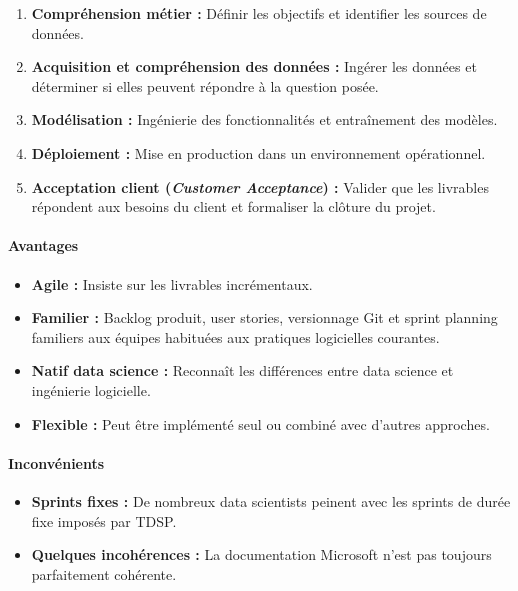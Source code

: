 \begin{enumerate}[leftmargin=*, label=\arabic*.]
  \item \textbf{Compréhension métier :} Définir les objectifs et identifier les sources
        de données.
  \item \textbf{Acquisition et compréhension des données :} Ingérer les données et
        déterminer si elles peuvent répondre à la question posée.
  \item \textbf{Modélisation :} Ingénierie des fonctionnalités et entraînement des
        modèles.
  \item \textbf{Déploiement :} Mise en production dans un environnement opérationnel.
  \item \textbf{Acceptation client (\textit{Customer Acceptance}) :} Valider que les
        livrables répondent aux besoins du client et formaliser la clôture du projet.
\end{enumerate}

\paragraph{Avantages}
\begin{itemize}[leftmargin=*, label=\textbullet]
  \item \textbf{Agile :} Insiste sur les livrables incrémentaux.
  \item \textbf{Familier :} Backlog produit, user stories, versionnage Git et sprint
        planning familiers aux équipes habituées aux pratiques logicielles courantes.
  \item \textbf{Natif data science :} Reconnaît les différences entre data science et
        ingénierie logicielle.
  \item \textbf{Flexible :} Peut être implémenté seul ou combiné avec d'autres approches.
\end{itemize}

\paragraph{Inconvénients}
\begin{itemize}[leftmargin=*, label=\textbullet]
  \item \textbf{Sprints fixes :} De nombreux data scientists peinent avec les sprints de
        durée fixe imposés par TDSP.
  \item \textbf{Quelques incohérences :} La documentation Microsoft n'est pas toujours
        parfaitement cohérente.
\end{itemize}


